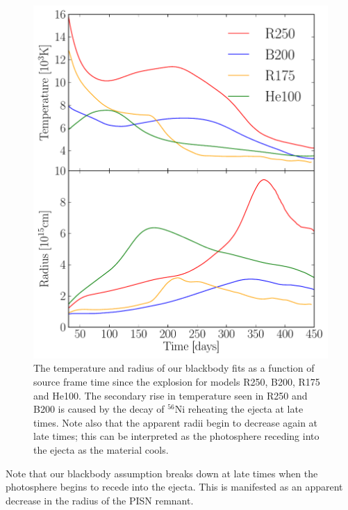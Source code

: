 \documentclass{thesis}
\begin{document}
\begin{figure}
  \begin{center}
    \includegraphics[width=\columnwidth]{bbmodels}
    \caption{\footnotesize The temperature and radius of our blackbody
      fits as a function of source frame time since the explosion
      for models R250, B200, R175 and He100.  The secondary rise in
      temperature seen in R250 and B200 is caused by the decay of
      $^{56}$Ni reheating the ejecta at late times.  Note also that the
      apparent radii begin to decrease again at late times; this can
      be interpreted as the photosphere receding into the ejecta as
      the material cools.}
    \label{bbmodels}
  \end{center}
\end{figure}
Note that our blackbody assumption breaks down at late times when the
photosphere begins to recede into the ejecta.  This is manifested as
an apparent decrease in the radius of the PISN remnant.
\end{document}
